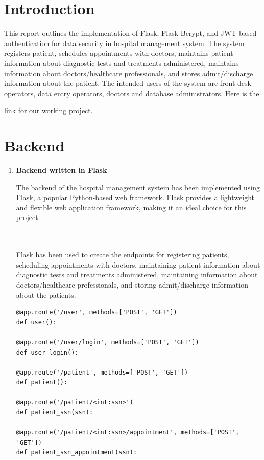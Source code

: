 \documentclass[12pt,a4paper]{article}
\begin{document}
\section*{ \hspace{-2mm}Introduction}
This report outlines the implementation of Flask, Flask Bcrypt, and JWT-based authentication for data security in hospital management system. The system registers patient, schedules appointments with doctors, maintains patient information about diagnostic tests and treatments administered, maintains information about doctors/healthcare professionals, and stores admit/discharge information about the patient. The intended users of the system are front desk operators, data entry operators, doctors and database administrators. Here is the {\href{https://sekhmet.vercel.app/}{link} for our working project.

\section*{ \hspace{-2mm}Backend}


\begin{enumerate}
\item \textbf{Backend written in Flask} 

The backend of the hospital management system has been implemented using Flask, a popular Python-based web framework. Flask provides a lightweight and flexible web application framework, making it an ideal choice for this project.

\\
\\Flask has been used to create the endpoints for registering patients, scheduling appointments with doctors, maintaining patient information about diagnostic tests and treatments administered, maintaining information about doctors/healthcare professionals, and storing admit/discharge information about the patients.
\\

\begin{lstlisting}
@app.route('/user', methods=['POST', 'GET'])
def user():

@app.route('/user/login', methods=['POST', 'GET'])
def user_login():

@app.route('/patient', methods=['POST', 'GET'])
def patient():

@app.route('/patient/<int:ssn>')
def patient_ssn(ssn):

@app.route('/patient/<int:ssn>/appointment', methods=['POST', 'GET'])
def patient_ssn_appointment(ssn):


\end{lstlisting}
\end{enumerate}}
\end{document}
